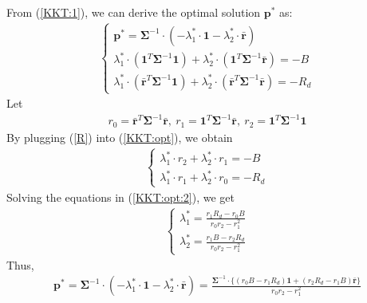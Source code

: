 \documentclass[12pt]{ftec2101}
\newcommand{\vect}[1]{\mathbf{#1}}
\begin{document}
\noindent

From (\ref{KKT:1}), we can derive the optimal solution $\vect{p}^{*}$ as:
\begin{align}
    \begin{cases}
        \boldsymbol{p^{*}} = \boldsymbol{\Sigma}^{-1} \cdot (-\lambda_{1}^{*} \cdot \boldsymbol{1} - \lambda_{2}^{*}\cdot \boldsymbol{\bar{r}}) \\
        \lambda_{1}^{*} \cdot (\boldsymbol{1}^{T} \boldsymbol{\Sigma}^{-1} \boldsymbol{1}) + \lambda_{2}^{*} \cdot (\boldsymbol{1}^{T} \boldsymbol{\Sigma}^{-1} \boldsymbol{\bar{r}})=-B \\
        \lambda_{1}^{*} \cdot (\boldsymbol{\bar{r}}^{T} \boldsymbol{\Sigma}^{-1} \boldsymbol{1}) + \lambda_{2}^{*} \cdot (\boldsymbol{\bar{r}}^{T} \boldsymbol{\Sigma}^{-1} \boldsymbol{\bar{r}}) =-R_{d}
    \end{cases}
    \label{KKT:opt}
\end{align} 
Let
\begin{align}
    r_{0}=\boldsymbol{\bar{r}}^{T} \boldsymbol{\Sigma}^{-1} \boldsymbol{\bar{r}},~
    r_{1}=\boldsymbol{1}^{T} \boldsymbol{\Sigma}^{-1} \boldsymbol{\bar{r}},~
    r_{2}=\boldsymbol{1}^{T} \boldsymbol{\Sigma}^{-1} \boldsymbol{1}
    \label{R}
\end{align}
By plugging (\ref{R}) into (\ref{KKT:opt}), we obtain
\begin{align}
    \begin{cases}
        \lambda_{1}^{*} \cdot r_{2} + \lambda_{2}^{*} \cdot r_{1}=-B \\
        \lambda_{1}^{*} \cdot r_{1} + \lambda_{2}^{*} \cdot r_{0}=-R_{d}
    \end{cases}
    \label{KKT:opt:2}
\end{align}
Solving the equations in (\ref{KKT:opt:2}), we get  
\begin{align}
    \begin{cases}
        \lambda_1^* = \frac{r_1 R_d- r_0 B}{r_0 r_2 -r_1^2} \\
        \lambda_2^* = \frac{r_1 B - r_2 R_d}{r_0 r_2 -r_1^2}
    \end{cases}
\end{align}
Thus,
\begin{align}
    \vect{p}^* = \boldsymbol{\Sigma}^{-1} \cdot (-\lambda_{1}^{*} \cdot \boldsymbol{1} - \lambda_{2}^{*}\cdot \boldsymbol{\bar{r}}) =
    \frac{\boldsymbol{\Sigma}^{-1} \cdot \big \{  (r_{0}B-r_{1}R_{d})\boldsymbol{1} + (r_{2}R_{d}-r_{1}B)\boldsymbol{\bar{r}}   \big \}}{r_{0}r_{2}-r_{1}^{2}}
\end{align}
\end{document}
